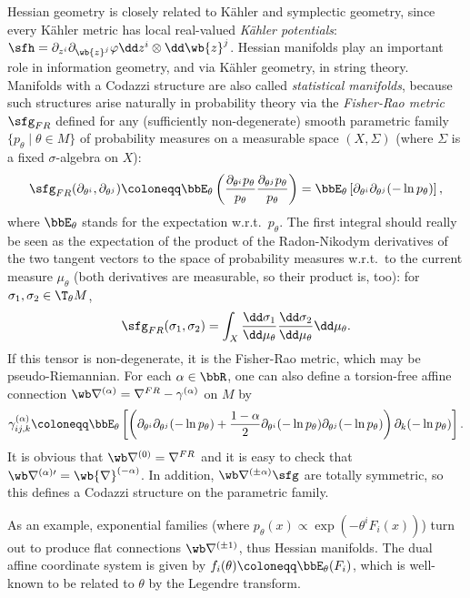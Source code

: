 \begin{example}
    Hessian geometry is closely related to K\"ahler and symplectic geometry, since every K\"ahler metric has local real-valued \emph{K\"ahler potentials}: $\sfh=\partial_{z^i}\partial_{\wb{z}^j}\varphi \dd z^i\otimes\dd\wb{z}^j$. Hessian manifolds play an important role in information geometry, and via K\"ahler geometry, in string theory. Manifolds with a Codazzi structure are also called \emph{statistical manifolds}, because such structures arise naturally in probability theory via the \emph{Fisher-Rao metric} $\sfg_{FR}$ defined for any (sufficiently non-degenerate) smooth parametric family $\{p_\theta\mid \theta\in M\}$ of probability measures on a measurable space $(X,\varSigma)$ (where $\varSigma$ is a fixed $\sigma$-algebra on $X$):
    \[\sfg_{FR}(\partial_{\theta^i},\partial_{\theta^j})\coloneqq \bbE_\theta\left(\frac{\partial_{\theta^i} p_\theta}{p_\theta} \frac{\partial_{\theta^j} p_\theta}{p_\theta}\right)=\bbE_\theta\left[\partial_{\theta^i} \partial_{\theta^j}(-\ln p_\theta)\right],\]
    where $\bbE_\theta$ stands for the expectation w.r.t.\ $p_\theta$. The first integral should really be seen as the expectation of the product of the Radon-Nikodym derivatives of the two tangent vectors to the space of probability measures w.r.t.\ to the current measure $\mu_\theta$ (both derivatives are measurable, so their product is, too): for $\sigma_1,\sigma_2\in \T_\theta M$, 
    \[\sfg_{FR}(\sigma_1,\sigma_2)=\int_X \frac{\dd \sigma_1}{\dd \mu_\theta}\frac{\dd \sigma_2}{\dd \mu_\theta}\dd \mu_\theta.\] 
    If this tensor is non-degenerate, it is the Fisher-Rao metric, which may be pseudo-Riemannian. For each $\alpha\in\bbR$, one can also define a torsion-free affine connection $\wb\nabla^{(\alpha)}=\nabla^{FR}-\gamma^{(\alpha)}$ on $M$ by
    \[\gamma_{ij,k}^{(\alpha)}\coloneqq \bbE_\theta \left[\left(\partial_{\theta^i}\partial_{\theta^j}(-\ln p_\theta)+\frac{1-\alpha}{2}\partial_{\theta^i}(-\ln p_\theta)\partial_{\theta^j}(-\ln p_\theta)\right)\partial_k(-\ln p_\theta)\right].\]
    It is obvious that $\wb\nabla^{(0)}=\nabla^{FR}$ and it is easy to check that $\wb\nabla^{(\alpha)\prime}=\wb{\nabla}^{(-\alpha)}$. In addition, $\wb\nabla^{(\pm\alpha)}\sfg$ are totally symmetric, so this defines a Codazzi structure on the parametric family. 
    
    As an example, exponential families (where $p_\theta(x)\propto \exp(-\theta^iF_i(x))$) turn out to produce flat connections $\wb\nabla^{(\pm 1)}$, thus Hessian manifolds. The dual affine coordinate system is given by $f_i(\theta)\coloneqq \bbE_\theta(F_i)$, which is well-known to be related to $\theta$ by the Legendre transform.
\end{example}





